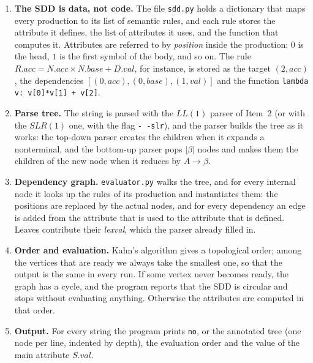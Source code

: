 \documentclass[11pt]{article}
\begin{document}
\begin{enumerate}
  \item \textbf{The SDD is data, not code.} The file \texttt{sdd.py} holds a dictionary
        that maps every production to its list of semantic rules, and each rule stores
        the attribute it defines, the list of attributes it uses, and the function that
        computes it. Attributes are referred to by \emph{position} inside the
        production: $0$ is the head, $1$ is the first symbol of the body, and so on.
        The rule $R.acc = N.acc \times N.base + D.val$, for instance, is stored as the
        target $(2,\textit{acc})$, the dependencies
        $[(0,\textit{acc}), (0,\textit{base}), (1,\textit{val})]$ and the function
        \verb|lambda v: v[0]*v[1] + v[2]|.

  \item \textbf{Parse tree.} The string is parsed with the $LL(1)$ parser of Item~2 (or
        with the $SLR(1)$ one, with the flag \texttt{-\,-slr}), and the parser builds the
        tree as it works: the top-down parser creates the children when it expands a
        nonterminal, and the bottom-up parser pops $|\beta|$ nodes and makes them the
        children of the new node when it reduces by $A \rightarrow \beta$.

  \item \textbf{Dependency graph.} \texttt{evaluator.py} walks the tree, and for every
        internal node it looks up the rules of its production and instantiates them: the
        positions are replaced by the actual nodes, and for every dependency an edge is
        added from the attribute that is used to the attribute that is defined. Leaves
        contribute their \textit{lexval}, which the parser already filled in.

  \item \textbf{Order and evaluation.} Kahn's algorithm gives a topological order; among
        the vertices that are ready we always take the smallest one, so that the output
        is the same in every run. If some vertex never becomes ready, the graph has a
        cycle, and the program reports that the SDD is circular and stops without
        evaluating anything. Otherwise the attributes are computed in that order.

  \item \textbf{Output.} For every string the program prints \texttt{no}, or the
        annotated tree (one node per line, indented by depth), the evaluation order and
        the value of the main attribute $S.val$.
\end{enumerate}
\end{document}
